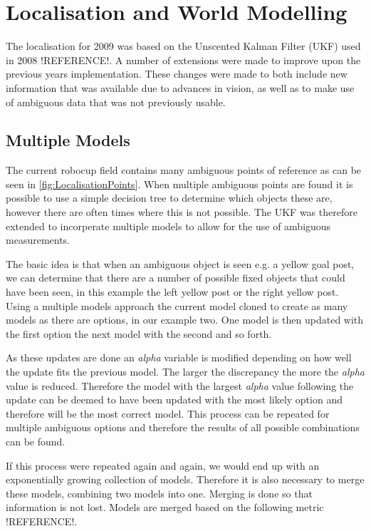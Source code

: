\section{Localisation and World Modelling}
\label{sec:Localisation}
The localisation for 2009 was based on the Unscented Kalman Filter (UKF) used in 2008 !REFERENCE!. A number of extensions were 
made to improve upon the previous years implementation. These changes were made to both include new information that was available due to advances in vision, as well as to make use of ambiguous data that was not previously usable.

\subsection{Multiple Models}
The current robocup field contains many ambiguous points of reference as can be seen in \autoref{fig:LocalisationPoints}. When multiple ambiguous points are found it is possible to use a simple decision tree to determine which objects these are, however there are often times where this is not possible. The UKF was therefore extended to incorperate multiple models to allow for the use of ambiguous measurements.

The basic idea is that when an ambiguous object is seen e.g. a yellow goal post, we can determine that there are a number of possible fixed objects that could have been seen, in this example the left yellow post or the right yellow post. Using a multiple models approach the current model cloned to create as many models as there are options, in our example two. One model is then updated with the first option the next model with the second and so forth.

As these updates are done an \emph{alpha} variable is modified depending on how well the update fits the previous model. The larger the discrepancy the more the \emph{alpha} value is reduced. Therefore the model with the largest \emph{alpha} value following the update can be deemed to have been updated with the most likely option and therefore will be the most correct model. This process can be repeated for multiple ambiguous options and therefore the results of all possible combinations can be found.

If this process were repeated again and again, we would end up with an exponentially growing collection of models. Therefore it is also necessary to merge these models, combining two models into one. Merging is done so that information is not lost. Models are merged based on the following metric !REFERENCE!.


